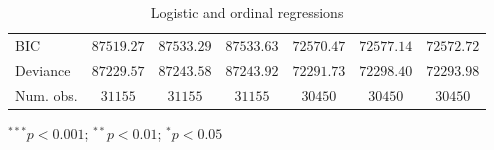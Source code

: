 \begin{table}
\begin{center}
\begin{threeparttable}
\begin{tabular}{l c c c c c c}
BIC                             & $87519.27$    & $87533.29$    & $87533.63$    & $72570.47$    & $72577.14$    & $72572.72$    \\
Deviance                        & $87229.57$    & $87243.58$    & $87243.92$    & $72291.73$    & $72298.40$    & $72293.98$    \\
Num. obs.                       & $31155$       & $31155$       & $31155$       & $30450$       & $30450$       & $30450$       \\
\bottomrule
\end{tabular}
\begin{tablenotes}[flushleft]
\scriptsize{\item $^{***}p<0.001$; $^{**}p<0.01$; $^{*}p<0.05$}
\end{tablenotes}
\end{threeparttable}
\caption{Logistic and ordinal regressions}
\label{table:coefficients}
\end{center}
\end{table}
